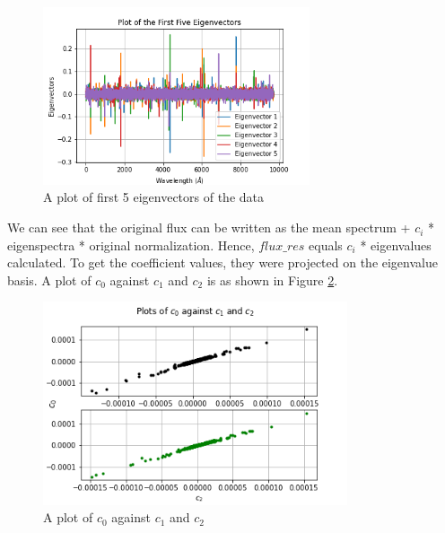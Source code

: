\documentclass[11pt]{article}
\begin{document}
	\begin{figure}[!htb]\begin{center} 
			\vspace{12pt}
			\includegraphics[width=0.7\textwidth]{eigenvector_plots.png}
			\caption{A plot of first 5 eigenvectors of the data }
			\label{fig:eigenvector_plots} 
		\end{center}
	\end{figure}

We can see that the original flux can be written as the mean spectrum + $c_{i}$ * eigenspectra * original normalization. Hence, $flux\_res$ equals $c_{i}$ * eigenvalues calculated. To get the coefficient values, they were projected on the eigenvalue basis. A plot of $c_{0}$ against $c_{1}$ and $c_{2}$ is as shown in Figure \ref{fig:c0_vs_c1_and_c2}.

	\begin{figure}[!htb]\begin{center} 
			\vspace{12pt}
			\includegraphics[width=0.8\textwidth]{c0_vs_c1_and_c2.png}
			\caption{A plot of $c_{0}$ against $c_{1}$ and $c_{2}$ }
			\label{fig:c0_vs_c1_and_c2} 
		\end{center}
	\end{figure}
\end{document}
